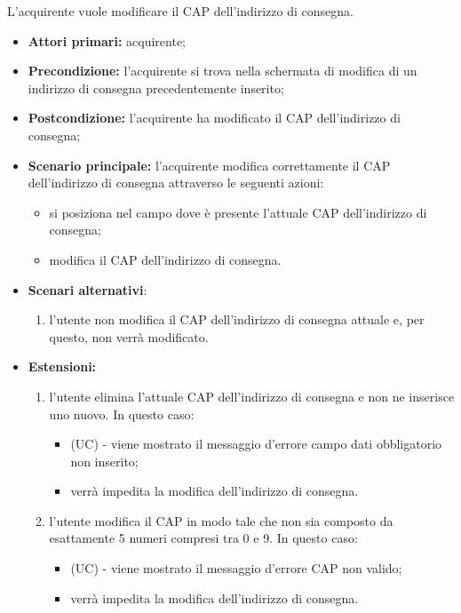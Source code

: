 L'acquirente vuole modificare il CAP dell'indirizzo di consegna.
\begin{itemize}
    \item \textbf{Attori primari:} acquirente;
    \item \textbf{Precondizione:} l'acquirente si trova nella schermata di modifica di un indirizzo di consegna precedentemente inserito;
    \item \textbf{Postcondizione:} l'acquirente ha modificato il CAP dell'indirizzo di consegna;
    \item \textbf{Scenario principale:} l'acquirente modifica correttamente il CAP dell'indirizzo di consegna attraverso le seguenti azioni:
    \begin{itemize}
        \item si posiziona nel campo dove è presente l'attuale CAP dell'indirizzo di consegna;
        \item modifica il CAP dell'indirizzo di consegna.
    \end{itemize}
    \item \textbf{Scenari alternativi}:
    \begin{enumerate}[label=\lett]
        \item l'utente non modifica il CAP dell'indirizzo di consegna attuale e, per questo, non verrà modificato.
    \end{enumerate}
    \item \textbf{Estensioni:}
    \begin{enumerate}[label=\lett]
        \item l'utente elimina l'attuale CAP dell'indirizzo di consegna e non ne inserisce uno nuovo. In questo caso:
        \begin{itemize}
            \item (UC) - viene mostrato il messaggio d'errore campo dati obbligatorio non inserito;
            \item verrà impedita la modifica dell'indirizzo di consegna.
        \end{itemize}
        \item l'utente modifica il CAP in modo tale che non sia composto da esattamente 5 numeri compresi tra 0 e 9. In questo caso:
        \begin{itemize}
            \item (UC) - viene mostrato il messaggio d'errore CAP non valido;
            \item verrà impedita la modifica dell'indirizzo di consegna.
        \end{itemize}
    \end{enumerate}
\end{itemize}

